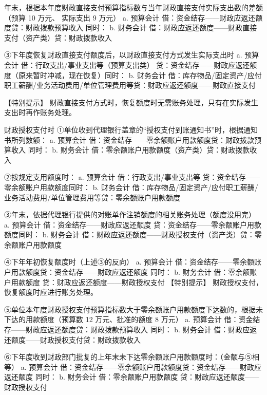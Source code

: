 \documentclass[UTF8,12pt]{ctexart}
\numberwithin{equation}{section} %
\numberwithin{figure}{section}
\numberwithin{table}{section}
\begin{document}
	年末，根据本年度财政直接支付预算指标数与当年财政直接支付实际支出数的差额（预算 10 万元、
	实际支出 9 万元）
	a.	预算会计
	借：资金结存——财政应返还额度贷：财政拨款预算收入
	同时：
	b.	财务会计
	借：财政应返还额度——财政直接支付（资产类）贷：财政拨款收入
	
	③下年度恢复财政直接支付额度后，以财政直接支付方式发生实际支出时
	a.	预算会计
	借：行政支出/事业支出等（预算支出类）
	贷：资金结存——财政应返还额度（原来暂时冲减，现在恢复）同时：
	b.	财务会计
	借：库存物品/固定资产/应付职工薪酬/业务活动费用/单位管理费用等贷：财政应返还额度——财政直接支付
	
	【特别提示】
	财政直接支付方式时，恢复额度时无需账务处理，只有在实际发生支出时再作账务处理。
	
	财政授权支付时
	①单位收到代理银行盖章的“授权支付到账通知书”时，根据通知书所列数额：
	a.	预算会计
	借：资金结存——零余额账户用款额度贷：财政拨款预算收入
	同时：
	b.	财务会计
	借：零余额账户用款额度（资产类）贷：财政拨款收入
	
	②按规定支用额度时：
	a.	预算会计
	借：行政支出/事业支出等
	贷：资金结存——零余额账户用款额度同时：
	b.	财务会计
	借：库存物品/固定资产/应付职工薪酬/业务活动费用/单位管理费用等贷：零余额账户用款额度
	
	③年末，依据代理银行提供的对账单作注销额度的相关账务处理（额度没用完）
	a.	预算会计
	借：资金结存——财政应返还额度
	贷：资金结存——零余额账户用款额度同时：
	b.	财务会计
	借：财政应返还额度——财政授权支付（资产类）贷：零余额账户用款额度
	
	④下年年初恢复额度时（上述③的反向）
	a.	预算会计
	借：资金结存——零余额账户用款额度贷：资金结存——财政应返还额度
	同时：
	b.	财务会计
	借：零余额账户用款额度
	贷：财政应返还额度——财政授权支付
	【特别提示】
	财政授权支付，恢复额度时应进行账务处理。
	
	⑤单位本年度财政授权支付预算指标数大于零余额账户用款额度下达数的，根据未下达的用款额度（预算数 12 万元、批准的额度 8 万元）
	a.	预算会计
	借：资金结存——财政应返还额度贷：财政拨款预算收入
	同时：
	b.	财务会计
	借：财政应返还额度——财政授权支付贷：财政拨款收入
	
	⑥下年度收到财政部门批复的上年末未下达零余额账户用款额度时：（金额与⑤相等）
	a.	预算会计
	借：资金结存——零余额账户用款额度贷：资金结存——财政应返还额度
	同时：
	b.	财务会计
	借：零余额账户用款额度
	贷：财政应返还额度——财政授权支付
	
\end{document}
